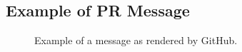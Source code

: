 \documentclass[a4paper,11pt]{sdm_internship}
\theoremstyle{definition}
\begin{document}
\begin{appendices}
\section{Example of PR Message}%
\label{app:appendix_message}
\begin{figure}[H]
  \centering
  \caption{Example of a message as rendered by GitHub.}%
  \label{fig:message_ex1}
\end{figure}


\end{appendices}
\end{document}
